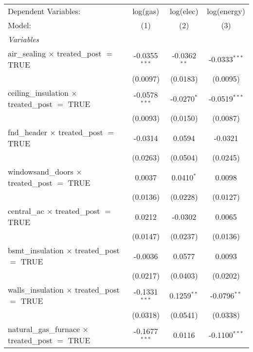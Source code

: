 
\begin{tabular}{lccc}
   \tabularnewline\midrule\midrule
   Dependent Variables:                                      & log(gas)        & log(elec)      & log(energy)\\
   Model:                                                    & (1)             & (2)            & (3)\\
   \midrule \emph{Variables} &   &   &  \\
   air\_sealing $\times$ treated\_post $=$ TRUE           & -0.0355$^{***}$ & -0.0362$^{**}$ & -0.0333$^{***}$\\
                                                             & (0.0097)        & (0.0183)       & (0.0095)\\
   ceiling\_insulation $\times$ treated\_post $=$ TRUE    & -0.0578$^{***}$ & -0.0270$^{*}$  & -0.0519$^{***}$\\
                                                             & (0.0093)        & (0.0150)       & (0.0087)\\
   fnd\_header $\times$ treated\_post $=$ TRUE            & -0.0314         & 0.0594         & -0.0321\\
                                                             & (0.0263)        & (0.0504)       & (0.0245)\\
   windowsand\_doors $\times$ treated\_post $=$ TRUE      & 0.0037          & 0.0410$^{*}$   & 0.0098\\
                                                             & (0.0136)        & (0.0228)       & (0.0127)\\
   central\_ac $\times$ treated\_post $=$ TRUE            & 0.0212          & -0.0302        & 0.0065\\
                                                             & (0.0147)        & (0.0237)       & (0.0136)\\
   bsmt\_insulation $\times$ treated\_post $=$ TRUE       & -0.0036         & 0.0577         & 0.0093\\
                                                             & (0.0217)        & (0.0403)       & (0.0202)\\
   walls\_insulation $\times$ treated\_post $=$ TRUE      & -0.1331$^{***}$ & 0.1259$^{**}$  & -0.0796$^{**}$\\
                                                             & (0.0318)        & (0.0541)       & (0.0338)\\
   natural\_gas\_furnace $\times$ treated\_post $=$ TRUE & -0.1677$^{***}$ & 0.0116         & -0.1100$^{***}$\\

\end{tabular}
